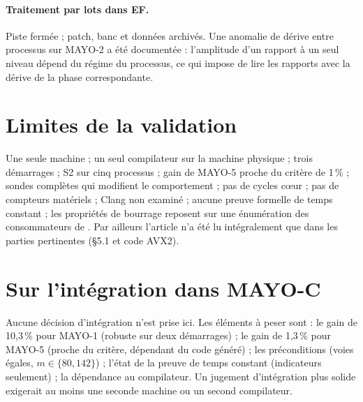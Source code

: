 \paragraph{Traitement par lots dans EF.} Piste fermée ; patch, banc et données archivés. Une anomalie de dérive entre processus sur MAYO-2 a été documentée : l'amplitude d'un rapport à un seul niveau dépend du régime du processus, ce qui impose de lire les rapports avec la dérive de la phase correspondante.

\section{Limites de la validation}
Une seule machine ; un seul compilateur sur la machine physique ; trois démarrages ; S2 sur cinq processus ; gain de MAYO-5 proche du critère de 1\,\% ; sondes complètes qui modifient le comportement ; pas de cycles cœur ; pas de compteurs matériels ; Clang non examiné ; aucune preuve formelle de temps constant ; les propriétés de bourrage reposent sur une énumération des consommateurs de . Par ailleurs l'article n'a été lu intégralement que dans les parties pertinentes (§5.1 et code AVX2).

\section{Sur l'intégration dans MAYO-C}
Aucune décision d'intégration n'est prise ici. Les éléments à peser sont : le gain de 10,3\,\% pour MAYO-1 (robuste sur deux démarrages) ; le gain de 1,3\,\% pour MAYO-5 (proche du critère, dépendant du code généré) ; les préconditions (voies égales, $m\in\{80,142\}$) ; l'état de la preuve de temps constant (indicateurs seulement) ; la dépendance au compilateur. Un jugement d'intégration plus solide exigerait au moins une seconde machine ou un second compilateur.
